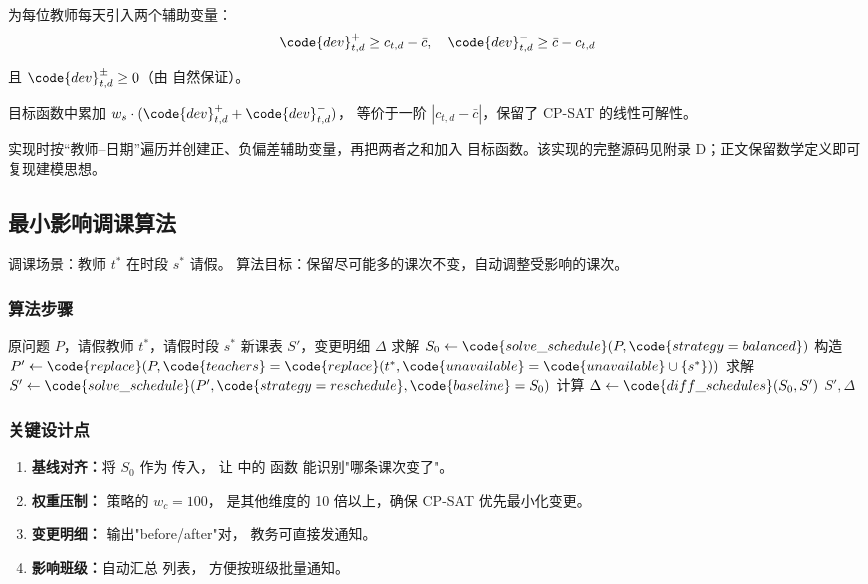 为每位教师每天引入两个辅助变量：
\[
\code{dev}^+_{t,d} \ge c_{t,d} - \bar{c}, \quad
\code{dev}^-_{t,d} \ge \bar{c} - c_{t,d}
\]

且 $\code{dev}^\pm_{t,d} \ge 0$（由  自然保证）。

目标函数中累加 $w_s \cdot (\code{dev}^+_{t,d} + \code{dev}^-_{t,d})$，
等价于一阶 $|c_{t,d} - \bar{c}|$，保留了 CP-SAT 的线性可解性。

实现时按“教师--日期”遍历并创建正、负偏差辅助变量，再把两者之和加入
目标函数。该实现的完整源码见附录 D；正文保留数学定义即可复现建模思想。

\subsection{最小影响调课算法}

调课场景：教师 $t^*$ 在时段 $s^*$ 请假。
算法目标：保留尽可能多的课次不变，自动调整受影响的课次。

\subsubsection{算法步骤}

\begin{algorithm}[h]
\caption{最小影响调课算法}
\label{alg:reschedule}
\begin{algorithmic}[1]
\Require 原问题 $P$，请假教师 $t^*$，请假时段 $s^*$
\Ensure 新课表 $S'$，变更明细 $\Delta$
\State 求解 $S_0 \gets \code{solve\_schedule}(P, \code{strategy=balanced})$
\State 构造 $P' \gets \code{replace}(P, \code{teachers}=\code{replace}(t^*, \code{unavailable}=\code{unavailable} \cup \{s^*\}))$
\State 求解 $S' \gets \code{solve\_schedule}(P', \code{strategy=reschedule}, \code{baseline}=S_0)$
\State 计算 $\Delta \gets \code{diff\_schedules}(S_0, S')$
\State \Return $S', \Delta$
\end{algorithmic}
\end{algorithm}

\subsubsection{关键设计点}

\begin{enumerate}[leftmargin=2em,itemsep=0.2em]
\item \textbf{基线对齐：}将 $S_0$ 作为  传入，
  让  中的  函数
  能识别"哪条课次变了"。
\item \textbf{权重压制：} 策略的 $w_c = 100$，
  是其他维度的 10 倍以上，确保 CP-SAT 优先最小化变更。
\item \textbf{变更明细：} 输出"before/after"对，
  教务可直接发通知。
\item \textbf{影响班级：}自动汇总  列表，
  方便按班级批量通知。
\end{enumerate}

